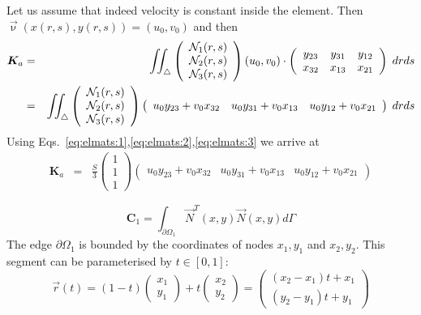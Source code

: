 Let us assume that indeed velocity is constant inside the element. Then 
$\vec{\upnu}(x(r,s),y(r,s))=(u_0,v_0)$ and then
\begin{eqnarray}
{\bm K}_a 
&=&  \iint_\triangle 
\left(
\begin{array}{c} 
{\mathcal{N}}_1(r,s) \\ {\mathcal{N}}_2(r,s) \\ {\mathcal{N}}_3(r,s)
\end{array}
\right)
(u_0,v_0)\cdot 
\left(
\begin{array}{ccc}
y_{23} & y_{31} & y_{12} \\
x_{32} & x_{13} & x_{21}
\end{array}
\right)
\; dr ds \nonumber \\
&=&  \iint_\triangle 
\left(
\begin{array}{c} 
{\mathcal{N}}_1(r,s) \\ {\mathcal{N}}_2(r,s) \\ {\mathcal{N}}_3(r,s)
\end{array}
\right)
\left(
\begin{array}{ccc}
u_0 y_{23} + v_0 x_{32} &
u_0 y_{31} + v_0 x_{13} &
u_0 y_{12} + v_0 x_{21}
\end{array}
\right)
\; dr ds \nonumber \\
\end{eqnarray}
Using Eqs.~\eqref{eq:elmats:1},\eqref{eq:elmats:2},\eqref{eq:elmats:3}
we arrive at
\begin{eqnarray}
{\bm K}_a 
&=& 
\frac{S}{3}
\left(
\begin{array}{c} 
1 \\ 1 \\ 1
\end{array}
\right)
\left(
\begin{array}{ccc}
u_0 y_{23} + v_0 x_{32} &
u_0 y_{31} + v_0 x_{13} &
u_0 y_{12} + v_0 x_{21}
\end{array}
\right)
\end{eqnarray}















\newpage
\[
{\bm C}_1
=\int_{\partial\Omega_1} \vec{N}^T(x,y) \vec{N}(x,y) d\Gamma
\]
The edge $\partial\Omega_1$ is bounded by the coordinates of nodes $x_1,y_1$
and $x_2,y_2$. This segment can be parameterised by $t\in[0,1]$:
\[
\vec{r}(t) = (1-t)\left(\begin{array}{c} x_1 \\ y_1 \end{array} \right) + 
t \left(\begin{array}{c} x_2 \\ y_2 \end{array} \right)
=
\left(\begin{array}{c} (x_2-x_1)t +x_1 \\ (y_2-y_1)t+y_1 \end{array} \right) 
\]

